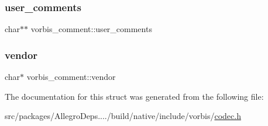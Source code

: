 \mbox{\label{structvorbis__comment_ac45cb70542b0be5ce3e8d85db6df48ec}} 
\subsubsection{\texorpdfstring{user\+\_\+comments}{user\_comments}}
{\footnotesize\ttfamily char$\ast$$\ast$ vorbis\+\_\+comment\+::user\+\_\+comments}

\mbox{\label{structvorbis__comment_a1f25158a2c045a6dd8a13b33b34612d3}} 
\subsubsection{\texorpdfstring{vendor}{vendor}}
{\footnotesize\ttfamily char$\ast$ vorbis\+\_\+comment\+::vendor}



The documentation for this struct was generated from the following file\+:\begin{DoxyCompactItemize}
\item 
src/packages/\+Allegro\+Deps..../build/native/include/vorbis/\hyperlink{vorbis_2codec_8h}{codec.\+h}\end{DoxyCompactItemize}
